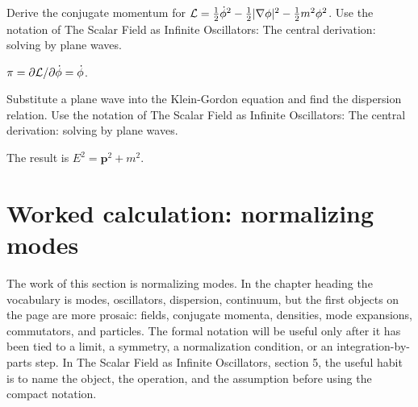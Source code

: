 \begin{exercise}
Derive the conjugate momentum for \(\mathcal L=\frac12\dot\phi^2-\frac12|\nabla\phi|^2-\frac12m^2\phi^2\).  Use the notation of The Scalar Field as Infinite Oscillators: The central derivation: solving by plane waves.
\begin{answer}
\(\pi=\partial\mathcal L/\partial\dot\phi=\dot\phi\).
\end{answer}
\end{exercise}

\begin{exercise}
Substitute a plane wave into the Klein-Gordon equation and find the dispersion relation.  Use the notation of The Scalar Field as Infinite Oscillators: The central derivation: solving by plane waves.
\begin{answer}
The result is \(E^2=\bm p^2+m^2\).
\end{answer}
\end{exercise}



\section{Worked calculation: normalizing modes}













The work of this section is normalizing modes.  In the chapter heading the vocabulary is modes, oscillators, dispersion, continuum, but the first objects on the page are more prosaic: fields, conjugate momenta, densities, mode expansions, commutators, and particles.  The formal notation will be useful only after it has been tied to a limit, a symmetry, a normalization condition, or an integration-by-parts step.  In The Scalar Field as Infinite Oscillators, section 5, the useful habit is to name the object, the operation, and the assumption before using the compact notation.

